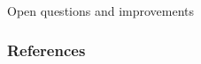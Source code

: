 \documentclass[../main.tex]{subfiles}
\begin{document}
\begin{frame}[fragile]{Open questions and improvements}
\end{frame}


\begin{frame}[t, allowframebreaks]
\frametitle{References}


\end{frame}
\end{document}

